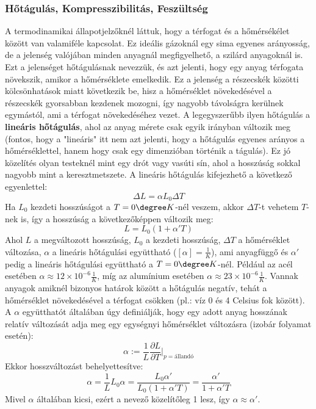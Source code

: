 \documentclass[a4paper,12pt]{article}
\begin{document}
\subsubsection{Hőtágulás, Kompresszibilitás, Feszültség}
A termodinamikai állapotjelzőknél láttuk, hogy a térfogat és a hőmérsékélet között van valamiféle kapcsolat. Ez ideális gázoknál egy sima egyenes arányosság,
de a jelenség valójában minden anyagnál megfigyelhető, a szilárd anyagoknál is. Ezt a jelenséget hőtágulásnak nevezzük, és azt jelenti,
hogy egy anyag térfogata növekszik, amikor a hőmérséklete emelkedik. Ez a jelenség a részecskék közötti kölcsönhatások miatt következik be, hisz a hőmérséklet növekedésével a részecskék gyorsabban kezdenek mozogni,
így nagyobb távolságra kerülnek egymástól, ami a térfogat növekedéséhez vezet. A legegyszerűbb ilyen hőtágulás a \textbf{lineáris hőtágulás}, ahol az anyag mérete csak egyik irányban változik meg (fontos, hogy a "lineáris" itt nem azt jelenti, hogy a hőtágulás egyenes arányos a hőmérséklettel, hanem hogy csak egy dimenzióban történik a tágulás).
Ez jó közelítés olyan testeknél mint egy drót vagy vasúti sín, ahol a hosszúság sokkal nagyobb mint a keresztmetszete. A lineáris hőtágulás kifejezhető a következő egyenlettel:
\begin{equation}
    \Delta L = \alpha L_0 \Delta T
\end{equation}
Ha $L_0$ kezdeti hosszúságot a $T = 0\degree K$-nél veszem, akkor $\Delta T$-t vehetem $T$-nek is, így a hosszúság a következőképpen változik meg:
\begin{equation}
    L = L_0 (1 + \alpha' T)
\end{equation}
Ahol $L$ a megváltozott hosszúság, $L_0$ a kezdeti hosszúság, $\Delta T$ a hőmérséklet változása, $\alpha$ a lineáris hőtágulási együttható ($\left[\alpha\right] = \frac{1}{K}$), ami anyagfüggő és $\alpha'$ pedig a lineáris hőtágulási együttható a $T = 0\degree K$-nél. Például az acél esetében $\alpha \approx 12 \times 10^{-6} \frac{1}{K}$, míg
az alumínium esetében $\alpha \approx 23 \times 10^{-6} \frac{1}{K}$. Vannak anyagok amiknél bizonyos határok között a hőtágulás negatív, tehát a hőmérséklet növekedésével a térfogat csökken (pl.: víz 0 és 4 Celsius fok között).
A $\alpha$ együtthatót általában úgy definiálják, hogy egy adott anyag hosszának relatív változását adja meg egy egységnyi hőmérséklet változásra (izobár folyamat esetén):
\begin{equation}
    \alpha := \frac{1}{L} \frac{\partial L}{\partial T}\bigg|_{p=\text{állandó}}
\end{equation}
Ekkor hosszváltozást behelyettesítve:
\begin{equation}
    \alpha = \frac{1}{L} L_0 \alpha = \frac{L_0 \alpha '}{L_0(1 + \alpha' T)} = \frac{\alpha'}{1 + \alpha' T} 
\end{equation}
Mivel $\alpha$ általában kicsi, ezért a nevező közelítőleg 1 lesz, így $\alpha \approx \alpha'$.
\end{document}
